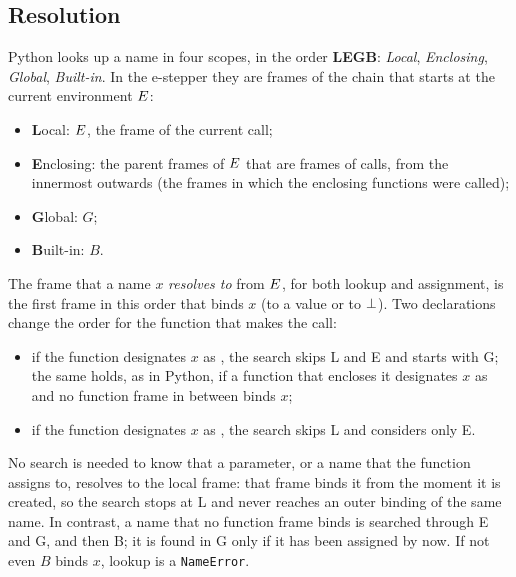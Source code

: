 
\subsection*{Resolution}

Python looks up a name in four scopes, in the order \textbf{LEGB}:
\emph{Local}, \emph{Enclosing}, \emph{Global}, \emph{Built-in}. In the
e-stepper they are frames of the chain that starts at the current environment
$E$:
\begin{itemize}
\item \textbf{L}ocal: $E$, the frame of the current call;
\item \textbf{E}nclosing: the parent frames of $E$ that are frames of calls,
  from the innermost outwards (the frames in which the enclosing functions were
  called);
\item \textbf{G}lobal: $G$;
\item \textbf{B}uilt-in: $B$.
\end{itemize}
The frame that a name $x$ \emph{resolves to} from $E$, for both lookup and
assignment, is the first frame in this order that binds $x$ (to a value or to
$\bot$). Two declarations change the order for the function that makes the call:
\begin{itemize}
\item if the function designates $x$ as , the search skips L and E
  and starts with G; the same holds, as in Python, if a function that encloses it
  designates $x$ as  and no function frame in between binds $x$;
\item if the function designates $x$ as , the search skips L and
  considers only E.
\end{itemize}
No search is needed to know that a parameter, or a name that the function
assigns to, resolves to the local frame: that frame binds it from the moment it
is created, so the search stops at L and never reaches an outer binding of the
same name. In contrast, a name that no function frame binds is searched
through E and G, and then B; it is found in G only if it has been assigned by
now. If not even $B$ binds $x$, lookup is a \texttt{NameError}.

